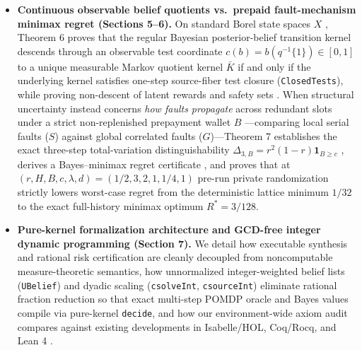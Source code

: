 \documentclass[11pt,a4paper]{article}
\begin{document}
\begin{itemize}
  rational computable \texttt{NoisyFiniteRiskOracle}. Because a single
  simultaneous row-calibration event
  \(G = \{\forall (x,a),\, d_{\mathrm{TV}}(P_{x,a}, \widehat{P}_{x,a}) \le u\}\)
  \citep{hoeffding1963, mcdiarmid1989, pinsker1964} controls empirical
  coarse-graining defects uniformly across \emph{all} candidate
  abstractions \(q_1, \dots, q_m\) via Markov pushforward contractivity
  \citep{dobrushin1956, csiszar1975}, selecting the first certified
  candidate incurs \emph{zero candidate-count union-bound penalty} and
  satisfies the sharp unconditional joint bound
  \(\mathbb{P}_J(\mathrm{accept} \land E) \le \min\{1, \alpha_N + (1-\alpha_N)\beta\}\).
\item
  \textbf{Continuous observable belief quotients vs.~prepaid
  fault-mechanism minimax regret (Sections 5--6).} On standard Borel
  state spaces \(X\)
  \citep{giry1982, bertsekasShreve1978, hernandezLerma1996}, Theorem 6
  proves that the regular Bayesian posterior-belief transition kernel
  descends through an observable test coordinate
  \(c(b) = b(q^{-1}\{1\}) \in [0,1]\) to a unique measurable Markov
  quotient kernel \(\bar{K}\)
  \citep{burkeRosenblatt1958, kemenySnell1960, larsenSkou1991, givanDeanGreig2003}
  if and only if the underlying kernel satisfies one-step source-fiber
  test closure (\texttt{ClosedTests}), while proving non-descent of
  latent rewards and safety sets
  \citep{jaeger2000, littmanSuttonSingh2001}. When structural
  uncertainty instead concerns \emph{how faults propagate} across
  redundant slots under a strict non-replenished prepayment wallet \(B\)
  \citep{altman1999, conantAshby1970, pearl2009}---comparing local
  serial faults (\(S\)) against global correlated faults
  (\(G\))---Theorem 7 establishes the exact three-step total-variation
  distinguishability \(\Delta_{3,B} = r^2(1-r)\mathbf{1}_{B \ge c}\)
  \citep{blackwell1953, coverThomas2006}, derives a Bayes--minimax
  regret certificate \citep{bellman1957, blackwell1965, savage1951}, and
  proves that at \((r, H, B, c, \lambda, d) = (1/2, 3, 2, 1, 1/4, 1)\)
  pre-run private randomization strictly lowers worst-case regret from
  the deterministic lattice minimum \(1/32\) to the exact full-history
  minimax optimum \(R^* = 3/128\).
\item
  \textbf{Pure-kernel formalization architecture and GCD-free integer
  dynamic programming (Section 7).} We detail how executable synthesis
  and rational risk certification are cleanly decoupled from
  noncomputable measure-theoretic semantics, how unnormalized
  integer-weighted belief lists (\texttt{UBelief}) and dyadic scaling
  (\texttt{csolveInt}, \texttt{csourceInt}) eliminate rational fraction
  reduction so that exact multi-step POMDP oracle and Bayes values
  compile via pure-kernel \texttt{decide}, and how our environment-wide
  axiom audit compares against existing developments in Isabelle/HOL,
  Coq/Rocq, and Lean 4
  \citep{affeldt2014, eberl2015, hoelzlNipkow2012, hoelzl2017, vajjha2021, schaeffelerAbdulaziz2023}.
\end{itemize}
\end{document}
